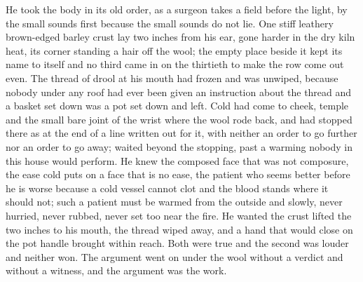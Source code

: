 He took the body in its old order, as a surgeon takes a field before the light, by the small sounds first because the small sounds do not lie. One stiff leathery brown-edged barley crust lay two inches from his ear, gone harder in the dry kiln heat, its corner standing a hair off the wool; the empty place beside it kept its name to itself and no third came in on the thirtieth to make the row come out even. The thread of drool at his mouth had frozen and was unwiped, because nobody under any roof had ever been given an instruction about the thread and a basket set down was a pot set down and left. Cold had come to cheek, temple and the small bare joint of the wrist where the wool rode back, and had stopped there as at the end of a line written out for it, with neither an order to go further nor an order to go away;  waited beyond the stopping, past a warming nobody in this house would perform. He knew the composed face that was not composure, the ease cold puts on a face that is no ease, the patient who seems better before he is worse because a cold vessel cannot clot and the blood stands where it should not; such a patient must be warmed from the outside and slowly, never hurried, never rubbed, never set too near the fire. He wanted the crust lifted the two inches to his mouth, the thread wiped away, and a hand that would close on the pot handle brought within reach. Both were true and the second was louder and neither won. The argument went on under the wool without a verdict and without a witness, and the argument was the work.

